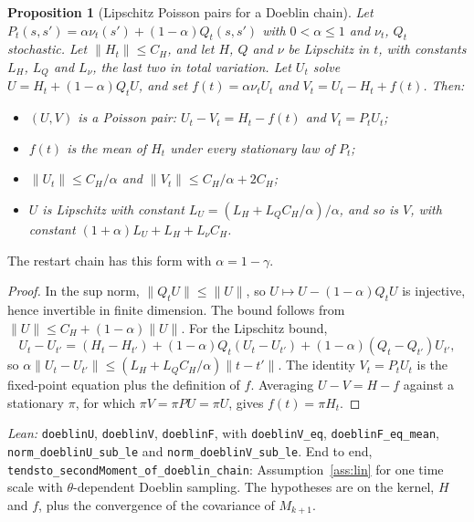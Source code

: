 \documentclass[11pt]{article}
\newtheorem{proposition}[theorem]{Proposition}
\theoremstyle{definition}
\theoremstyle{remark}
\begin{document}
\begin{proposition}[Lipschitz Poisson pairs for a Doeblin chain]\label{prop:doeblin}
Let $P_t(s, s') = \alpha\nu_t(s') + (1 - \alpha)Q_t(s, s')$ with $0 < \alpha \le 1$ and $\nu_t$, $Q_t$
stochastic. Let $\|H_t\| \le C_H$, and let $H$, $Q$ and $\nu$ be Lipschitz in $t$, with constants $L_H$,
$L_Q$ and $L_\nu$, the last two in total variation. Let $U_t$ solve $U = H_t + (1 - \alpha)Q_tU$,
and set $f(t) = \alpha\nu_tU_t$ and $V_t = U_t - H_t + f(t)$. Then:
\begin{itemize}
\item $(U, V)$ is a Poisson pair: $U_t - V_t = H_t - f(t)$ and $V_t = P_tU_t$;
\item $f(t)$ is the mean of $H_t$ under every stationary law of $P_t$;
\item $\|U_t\| \le C_H/\alpha$ and $\|V_t\| \le C_H/\alpha + 2C_H$;
\item $U$ is Lipschitz with constant $L_U = (L_H + L_QC_H/\alpha)/\alpha$, and so is $V$, with constant
  $(1 + \alpha)L_U + L_H + L_\nu C_H$.
\end{itemize}
\end{proposition}
The restart chain has this form with $\alpha = 1 - \gamma$.
\begin{proof}
In the sup norm, $\|Q_tU\| \le \|U\|$, so $U \mapsto U - (1 - \alpha)Q_tU$ is injective, hence
invertible in finite dimension. The bound follows from $\|U\| \le C_H + (1 - \alpha)\|U\|$. For the
Lipschitz bound,
\[
  U_t - U_{t'} = (H_t - H_{t'}) + (1 - \alpha)Q_t(U_t - U_{t'}) + (1 - \alpha)(Q_t - Q_{t'})U_{t'},
\]
so $\alpha\|U_t - U_{t'}\| \le (L_H + L_QC_H/\alpha)\|t - t'\|$. The identity $V_t = P_tU_t$ is the
fixed-point equation plus the definition of $f$. Averaging $U - V = H - f$ against a stationary $\pi$,
for which $\pi V = \pi P U = \pi U$, gives $f(t) = \pi H_t$.
\end{proof}
\noindent\emph{Lean:} \texttt{doeblinU}, \texttt{doeblinV}, \texttt{doeblinF}, with \texttt{doeblinV\_eq},
\texttt{doeblinF\_eq\_mean}, \texttt{norm\_doeblinU\_sub\_le} and \texttt{norm\_doeblinV\_sub\_le}. End to
end, \texttt{tendsto\_secondMoment\_of\_doeblin\_chain}: Assumption~\ref{ass:lin} for one time scale with
$\theta$-dependent Doeblin sampling. The hypotheses are on the kernel, $H$ and $f$, plus the convergence
of the covariance of $M_{k+1}$.
\end{document}
